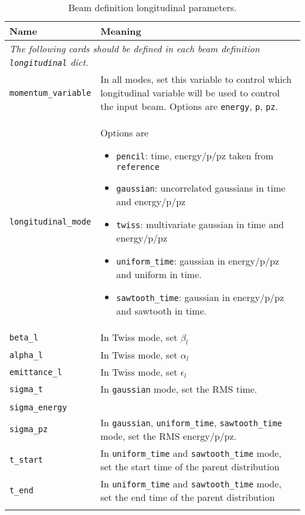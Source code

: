 \begin{table*}
\begin{center}
\caption{Beam definition longitudinal parameters.}
\begin{tabularx}{\linewidth}{lX}
Name & Meaning \\
\hline
\multicolumn{2}{l}{\emph{The following cards should be defined in each beam definition \verb|longitudinal| dict.}} \\
\hline
\verb|momentum_variable| & In all modes, set this variable to control which longitudinal variable will be used to control the input beam. Options are \verb|energy|, \verb|p|, \verb|pz|. \\
\verb|longitudinal_mode| & Options are
                          \begin{itemize}
                            \setlength{\itemsep}{0mm}
                            \item \verb|pencil|: time, energy/p/pz taken from \verb|reference|
                            \item \verb|gaussian|: uncorrelated gaussians in time and energy/p/pz
                            \item \verb|twiss|: multivariate gaussian in time and energy/p/pz
                            \item \verb|uniform_time|: gaussian in energy/p/pz and uniform in time.
                            \item \verb|sawtooth_time|: gaussian in energy/p/pz and sawtooth in time.
                          \end{itemize} \\
\hline
\verb|beta_l| & In Twiss mode, set $\beta_l$\\
\verb|alpha_l| & In Twiss mode, set $\alpha_l$\\
\verb|emittance_l| & In Twiss mode, set $\epsilon_l$\\
\hline
\verb|sigma_t| & In \verb|gaussian| mode, set the RMS time. \\
\begin{tabular}{l} \verb|sigma_p| \\ \verb|sigma_energy| \\ \verb|sigma_pz| \end{tabular} & In \verb|gaussian|, \verb|uniform_time|, \verb|sawtooth_time| mode, set the RMS energy/p/pz. \\
\hline
\verb|t_start| & In \verb|uniform_time| and \verb|sawtooth_time| mode, set the start time of the parent distribution \\
\verb|t_end| & In \verb|uniform_time| and \verb|sawtooth_time| mode, set the end time of the parent distribution \\
\begin{makeimage} %
\end{makeimage} 
\end{tabularx}
\end{center}
\end{table*}

